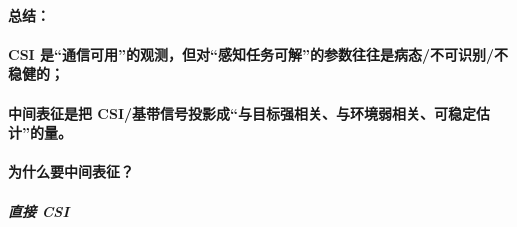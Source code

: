 \documentclass[
]{article}
\begin{document}
\paragraph{总结：}\label{ux603bux7ed3}

\paragraph{\texorpdfstring{\textbf{CSI
是``通信可用''的观测，但对``感知任务可解''的参数往往是病态/不可识别/不稳健的；}}{CSI 是``通信可用''的观测，但对``感知任务可解''的参数往往是病态/不可识别/不稳健的；}}\label{csi-ux662fux901aux4fe1ux53efux7528ux7684ux89c2ux6d4bux4f46ux5bf9ux611fux77e5ux4efbux52a1ux53efux89e3ux7684ux53c2ux6570ux5f80ux5f80ux662fux75c5ux6001ux4e0dux53efux8bc6ux522bux4e0dux7a33ux5065ux7684}

\paragraph{\texorpdfstring{\textbf{中间表征是把
CSI/基带信号投影成``与目标强相关、与环境弱相关、可稳定估计''的量。}}{中间表征是把 CSI/基带信号投影成``与目标强相关、与环境弱相关、可稳定估计''的量。}}\label{ux4e2dux95f4ux8868ux5f81ux662fux628a-csiux57faux5e26ux4fe1ux53f7ux6295ux5f71ux6210ux4e0eux76eeux6807ux5f3aux76f8ux5173ux4e0eux73afux5883ux5f31ux76f8ux5173ux53efux7a33ux5b9aux4f30ux8ba1ux7684ux91cf}

\paragraph{为什么要中间表征？}\label{ux4e3aux4ec0ux4e48ux8981ux4e2dux95f4ux8868ux5f81}

\subparagraph{\texorpdfstring{直接 CSI
}{直接 CSI }}\label{ux76f4ux63a5-csi}
\end{document}
